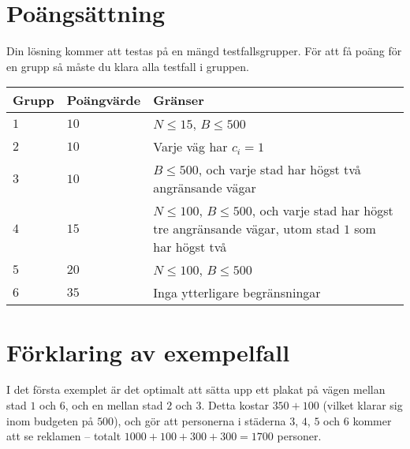 \section*{Poängsättning}
Din lösning kommer att testas på en mängd testfallsgrupper.
För att få poäng för en grupp så måste du klara alla testfall i gruppen.

\noindent
\begin{tabular}{| l | l | p{10cm} |}
\hline
Grupp & Poängvärde & Gränser \\ \hline
$1$   & $10$         & $N \le 15$, $B \le 500$ \\ \hline
$2$   & $10$         & Varje väg har $c_i = 1$ \\ \hline
$3$   & $10$         & $B \le 500$, och varje stad har högst två angränsande vägar \\ \hline
$4$   & $15$         & $N \le 100$, $B \le 500$, och varje stad har högst tre angränsande vägar, utom stad $1$ som har högst två \\ \hline
$5$   & $20$         & $N \le 100$, $B \le 500$ \\ \hline
$6$   & $35$         & Inga ytterligare begränsningar \\ \hline
\end{tabular}

\section*{Förklaring av exempelfall}
I det första exemplet är det optimalt att sätta upp ett plakat på vägen mellan stad $1$ och $6$, och en mellan stad $2$ och $3$.
Detta kostar $350 + 100$ (vilket klarar sig inom budgeten på $500$), och gör att personerna i städerna $3$, $4$, $5$ och $6$ kommer att se reklamen -- totalt $1000 + 100 + 300 + 300 = 1700$ personer.

